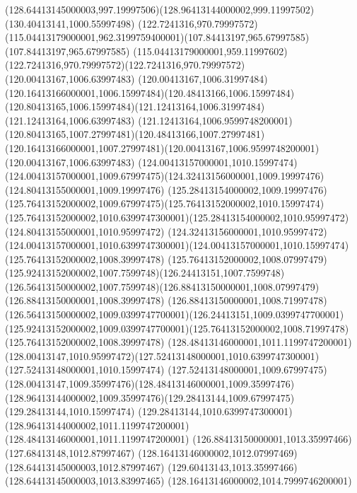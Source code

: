 {{	\curveto(128.64413145000003,997.19997506)(128.96413144000002,999.11997502)(130.40413141,1000.55997498)
	\closepath
	\moveto(122.7241316,970.79997572)
	\curveto(115.04413179000001,962.3199759400001)(107.84413197,965.67997585)(107.84413197,965.67997585)
	\curveto(115.04413179000001,959.11997602)(122.7241316,970.79997572)(122.7241316,970.79997572)
	\closepath
	\moveto(120.00413167,1006.63997483)
	\curveto(120.00413167,1006.31997484)(120.16413166000001,1006.15997484)(120.48413166,1006.15997484)
	\curveto(120.80413165,1006.15997484)(121.12413164,1006.31997484)(121.12413164,1006.63997483)
	\curveto(121.12413164,1006.9599748200001)(120.80413165,1007.27997481)(120.48413166,1007.27997481)
	\curveto(120.16413166000001,1007.27997481)(120.00413167,1006.9599748200001)(120.00413167,1006.63997483)
	\closepath
	\moveto(124.00413157000001,1010.15997474)
	\curveto(124.00413157000001,1009.67997475)(124.32413156000001,1009.19997476)(124.80413155000001,1009.19997476)
	\curveto(125.28413154000002,1009.19997476)(125.76413152000002,1009.67997475)(125.76413152000002,1010.15997474)
	\curveto(125.76413152000002,1010.6399747300001)(125.28413154000002,1010.95997472)(124.80413155000001,1010.95997472)
	\curveto(124.32413156000001,1010.95997472)(124.00413157000001,1010.6399747300001)(124.00413157000001,1010.15997474)
	\closepath
	\moveto(125.76413152000002,1008.39997478)
	\curveto(125.76413152000002,1008.07997479)(125.92413152000002,1007.7599748)(126.24413151,1007.7599748)
	\curveto(126.56413150000002,1007.7599748)(126.88413150000001,1008.07997479)(126.88413150000001,1008.39997478)
	\curveto(126.88413150000001,1008.71997478)(126.56413150000002,1009.0399747700001)(126.24413151,1009.0399747700001)
	\curveto(125.92413152000002,1009.0399747700001)(125.76413152000002,1008.71997478)(125.76413152000002,1008.39997478)
	\closepath
	\moveto(128.48413146000001,1011.1199747200001)
	\curveto(128.00413147,1010.95997472)(127.52413148000001,1010.6399747300001)(127.52413148000001,1010.15997474)
	\curveto(127.52413148000001,1009.67997475)(128.00413147,1009.35997476)(128.48413146000001,1009.35997476)
	\curveto(128.96413144000002,1009.35997476)(129.28413144,1009.67997475)(129.28413144,1010.15997474)
	\curveto(129.28413144,1010.6399747300001)(128.96413144000002,1011.1199747200001)(128.48413146000001,1011.1199747200001)
	\closepath
	\moveto(126.88413150000001,1013.35997466)
	\lineto(127.68413148,1012.87997467)
	\lineto(128.16413146000002,1012.07997469)
	\lineto(128.64413145000003,1012.87997467)
	\lineto(129.60413143,1013.35997466)
	\lineto(128.64413145000003,1013.83997465)
	\lineto(128.16413146000002,1014.7999746200001)
}}
